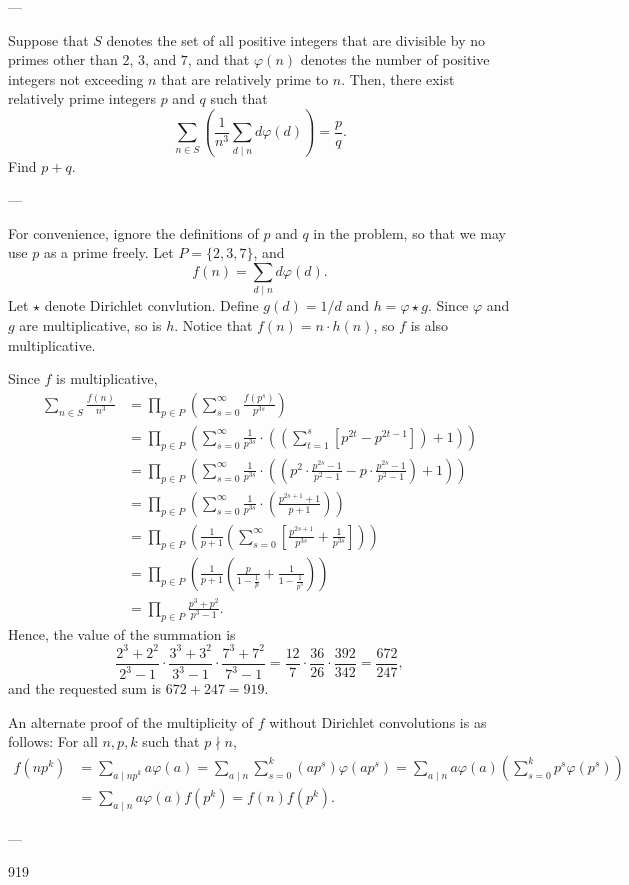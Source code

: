 
---

Suppose that $S$ denotes the set of all positive integers that are divisible by no primes other than $2$, $3$, and $7$, and that $\varphi(n)$ denotes the number of positive integers not exceeding $n$ that are relatively prime to $n$. Then, there exist relatively prime integers $p$ and $q$ such that \[\sum_{n\in S}\left(\frac1{n^3}\sum_{d\mid n}d\varphi(d)\right)=\frac pq.\]Find $p+q$.

---

For convenience, ignore the definitions of $p$ and $q$ in the problem, so that we may use $p$ as a prime freely. Let $P=\{2,3,7\}$, and \[f(n)=\sum_{d\mid n}d\varphi(d).\]
Let $\star$ denote Dirichlet convlution. Define $g(d)=1/d$ and $h=\varphi\star g$. Since $\varphi$ and $g$ are multiplicative, so is $h$. Notice that $f(n)=n\cdot h(n)$, so $f$ is also multiplicative.

Since $f$ is multiplicative,
\begin{align*}
    \sum_{n\in S} \frac{f(n)}{n^3} &= \prod_{p \in P} \left(\sum_{s=0}^\infty \frac{f(p^s)}{p^{3s}}\right)\\
    &= \prod_{p \in P} \left(\sum_{s=0}^\infty \frac{1}{p^{3s}} \cdot \left(\left(\sum_{t=1}^s \left[p^{2t}-p^{2t-1}\right]\right)+1\right)\right)\\
    &= \prod_{p \in P} \left(\sum_{s=0}^\infty \frac{1}{p^{3s}} \cdot \left(\left(p^2\cdot \frac{p^{2s}-1}{p^2-1}-p\cdot \frac{p^{2s}-1}{p^2-1}\right)+1\right)\right)\\
    &= \prod_{p \in P} \left(\sum_{s=0}^\infty \frac{1}{p^{3s}} \cdot \left(\frac{p^{2s+1}+1}{p+1}\right)\right)\\
    &= \prod_{p \in P} \left(\frac{1}{p+1}\left(\sum_{s=0}^\infty \left[\frac{p^{2s+1}}{p^{3s}}+\frac{1}{p^{3s}}\right]\right)\right)\\
    &= \prod_{p \in P} \left(\frac{1}{p+1}\left(\frac{p}{1-\frac{1}{p}}+\frac{1}{1-\frac{1}{p^3}}\right)\right)\\
    &= \prod_{p \in P} \frac{p^3+p^2}{p^3-1}.
\end{align*}
Hence, the value of the summation is \[\frac{2^3+2^2}{2^3-1}\cdot\frac{3^3+3^2}{3^3-1}\cdot\frac{7^3+7^2}{7^3-1}=\frac{12}7\cdot\frac{36}{26}\cdot\frac{392}{342}=\frac{672}{247},\]
and the requested sum is $672+247=919$.
\begin{boxremark}
    An alternate proof of the multiplicity of $f$ without Dirichlet convolutions is as follows: For all $n,p,k$ such that $p\nmid n$, \begin{align*}
        f(np^k) &= \sum_{a\mid np^k} a\varphi(a)= \sum_{a\mid n} \sum_{s=0}^k (ap^s)\varphi(ap^s) = \sum_{a\mid n}a\varphi(a)\left(\sum_{s=0}^k p^s\varphi(p^s)\right)\\ &= \sum_{a\mid n}a\varphi(a)f(p^k)= f(n)f(p^k).
    \end{align*}
\end{boxremark}

---

919

